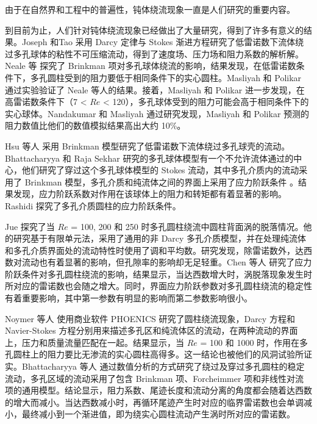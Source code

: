 由于在自然界和工程中的普遍性，钝体绕流现象一直是人们研究的重要内容。

到目前为止，人们针对钝体绕流现象已经做出了大量研究，得到了许多有意义的结果。Joseph 和Tao \cite{joseph1964effect} 采用 Darcy 定律与 Stokes 渐进方程研究了低雷诺数下流体绕过多孔球体的粘性不可压缩流动，得到了速度场、压力场和阻力系数的解析解。Neale 等 \cite{neale1973creeping} 探究了 Brinkman 项对多孔球体绕流的影响，结果发现，在低雷诺数条件下，多孔圆柱受到的阻力要低于相同条件下的实心圆柱。Masliyah 和 Polikar \cite{masliyah1980terminal} 通过实验验证了 Neale 等人的结果。接着，Masliyah 和 Polikar \cite{masliyah1980terminal} 进一步发现，在高雷诺数条件下（7 < $Re$ < 120），多孔球体受到的阻力可能会高于相同条件下的实心球体。Nandakumar 和 Masliyah \cite{nandakumar1982laminar} 通过研究发现，Masliyah 和 Polikar 预测的阻力数值比他们的数值模拟结果高出大约 10\%。

Hsu 等人 \cite{hsu2004re} 采用 Brinkman 模型研究了低雷诺数下流体绕过多孔球壳的流动。Bhattacharyya 和 Raja Sekhar \cite{bhattacharyya2004viscous} 研究的多孔球体模型有一个不允许流体通过的中心，他们研究了穿过这个多孔球体模型的 Stokes 流动，其中多孔介质内的流动采用了 Brinkman 模型，多孔介质和纯流体之间的界面上采用了应力阶跃条件 \cite{ochoa1995momentum1,ochoa1995momentum2}。结果发现，应力阶跃系数对作用在该球体上的阻力和转矩都有着显著的影响。Rashidi\cite{Rashidi2015} 探究了多孔介质圆柱的应力阶跃条件。%

Jue \cite{jue2004numerical} 探究了当 $Re$ = 100, 200 和 250 时多孔圆柱绕流中圆柱背面涡的脱落情况。他的研究基于有限单元法，采用了通用的非 Darcy 多孔介质模型，并在处理纯流体和多孔介质界面处的流动特性时使用了调和平均数。研究发现，除雷诺数外，达西数对流动也有着显著的影响，但孔隙率的影响却无足轻重。Chen 等人 \cite{chen2008numerical} 研究了应力阶跃条件对多孔圆柱绕流的影响，结果显示，当达西数增大时，涡脱落现象发生时所对应的雷诺数也会随之增大。同时，界面应力阶跃参数对多孔圆柱绕流的稳定性有着重要影响，其中第一参数有明显的影响而第二参数影响很小。

Noymer 等人 \cite{noymer1998drag} 使用商业软件 PHOENICS 研究了圆柱绕流现象，Darcy 方程和 Navier-Stokes 方程分别用来描述多孔区和纯流体区的流动，在两种流动的界面上，压力和质量流量匹配在一起。结果显示，当 $Re$ = 100 和 1000 时，作用在多孔圆柱上的阻力要比无渗流的实心圆柱高得多。这一结论也被他们的风洞试验所证实。Bhattacharyya 等人 \cite{bhattacharyya2006fluid} 通过数值分析的方式研究了绕过及穿过多孔圆柱的稳定流动，多孔区域的流动采用了包含 Brinkman 项、Forcheimmer 项和非线性对流项的通用模型。结论显示，阻力系数、尾迹长度和流动分离的角度都会随着达西数的增大而减小。当达西数减小时，再循环尾迹产生时对应的临界雷诺数也会单调减小，最终减小到一个渐进值，即为绕实心圆柱流动产生涡时所对应的雷诺数。

